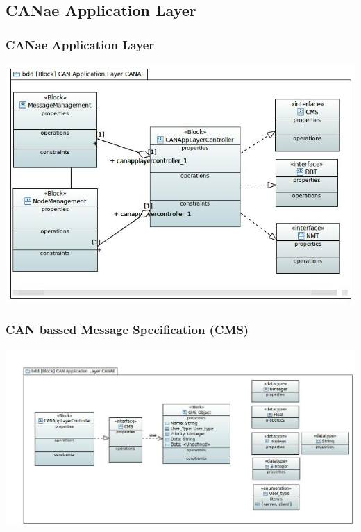 \subsection{CANae Application Layer}
\begin{frame}
	\frametitle{CANae Application Layer}
	\centering
	\includegraphics[scale=0.4]{images/CAN_Application_Layer_CANAE.jpg}
\end{frame}

\begin{frame}
	\frametitle{CAN bassed Message Specification (CMS)}
	\centering
	\includegraphics[scale=0.3]{images/CMS.JPG}
\end{frame}

